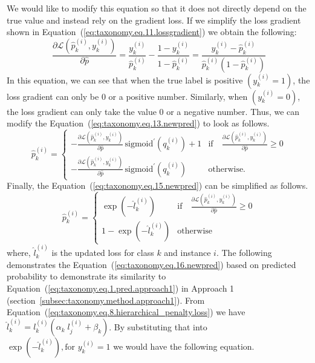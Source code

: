 We would like to modify this equation so that it does not directly depend on the true value and instead rely on the gradient loss. If we simplify the loss gradient shown in Equation~(\ref{eq:taxonomy.eq.11.lossgradient})  we obtain the following:
\begin{equation}
    \label{eq:taxonomy.eq.14.newlossgradient}
    \frac{\partial \mathcal{L}(\widehat{p}_k^{(i)}, y_k^{(i)})}{\partial \widehat{p}} = \frac{y_k^{(i)}}{\widehat{p}_k^{(i)}} - \frac{1 - y_k^{(i)}}{1 - \widehat{p}_k^{(i)}} = \frac{y_k^{(i)} - \widehat{p}_k^{(i)}}{\widehat{p}_k^{(i)}(1 - \widehat{p}_k^{(i)})}
\end{equation}
In this equation, we can see that when the true label is positive $\left(y_k^{(i)}=1\right) $, the loss gradient can only be 0 or a positive number. Similarly, when $\left(y_k^{(i)}=0\right) $, the loss gradient can only take the value 0 or a negative number. Thus, we can modify the Equation~(\ref{eq:taxonomy.eq.13.newpred})  to look as follows.
\begin{equation}
    \label{eq:taxonomy.eq.15.newpred}
    \widehat{p}_k^{(i)} =
    \begin{cases}
        -\frac{\partial \mathcal{L}(\widehat{p}_k^{(i)}, y_k^{(i)})}{\partial \widehat{p}} \, \text{sigmoid}^{\prime}(q_k^{(i)}) + 1 & \text{if} \quad \frac{\partial \mathcal{L}(\widehat{p}_k^{(i)}, y_k^{(i)})}{\partial \widehat{p}} \geq 0 \\
        -\frac{\partial \mathcal{L}(\widehat{p}_k^{(i)}, y_k^{(i)})}{\partial \widehat{p}} \, \text{sigmoid}^{\prime}(q_k^{(i)}) & \text{otherwise.}
    \end{cases}
\end{equation}
Finally, the Equation~(\ref{eq:taxonomy.eq.15.newpred}) can be simplified as follows.
\begin{equation}
    \label{eq:taxonomy.eq.16.newpred}
    \widehat{p}_k^{(i)} =
    \begin{cases}
        \exp(-\widehat{l}_k^{(i)}) & \text{if} \quad \frac{\partial \mathcal{L}(\widehat{p}_k^{(i)}, y_k^{(i)})}{\partial \widehat{p}} \geq 0 \\
        1 - \exp(-\widehat{l}_k^{(i)}) & \text{otherwise}
    \end{cases}
\end{equation}
where, ${\widehat l}_k^{(i)} $ is the updated loss for class $k $ and instance $i $.
The following demonstrates the Equation~(\ref{eq:taxonomy.eq.16.newpred}) based on predicted probability to demonstrate its similarity to Equation~(\ref{eq:taxonomy.eq.1.pred.approach1}) in Approach 1 (section~\ref{subsec:taxonomy.method.approach1}). From Equation~(\ref{eq:taxonomy.eq.8.hierarchical_penalty.loss}) we have $\hat{l}_k^{(i)}=l_k^{(i)}\left(\alpha_k\;l_j^{(i)}+\beta_k\right) $. By substituting that into $\exp{\left(-\widehat{l}_{k}^{(i)}\right)}, \text{for } y_{k}^{(i)}=1 $ we would have the following equation.
